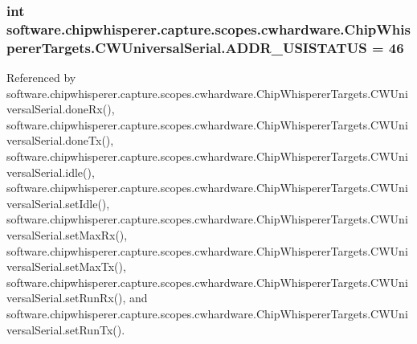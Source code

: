 \subsubsection[{A\+D\+D\+R\+\_\+\+U\+S\+I\+S\+T\+A\+T\+U\+S}]{\setlength{\rightskip}{0pt plus 5cm}int software.\+chipwhisperer.\+capture.\+scopes.\+cwhardware.\+Chip\+Whisperer\+Targets.\+C\+W\+Universal\+Serial.\+A\+D\+D\+R\+\_\+\+U\+S\+I\+S\+T\+A\+T\+U\+S = 46\hspace{0.3cm}{\ttfamily [static]}}\label{classsoftware_1_1chipwhisperer_1_1capture_1_1scopes_1_1cwhardware_1_1ChipWhispererTargets_1_1CWUniversalSerial_a6365eef9c1c87b5cf93d078ed43a1872}


Referenced by software.\+chipwhisperer.\+capture.\+scopes.\+cwhardware.\+Chip\+Whisperer\+Targets.\+C\+W\+Universal\+Serial.\+done\+Rx(), software.\+chipwhisperer.\+capture.\+scopes.\+cwhardware.\+Chip\+Whisperer\+Targets.\+C\+W\+Universal\+Serial.\+done\+Tx(), software.\+chipwhisperer.\+capture.\+scopes.\+cwhardware.\+Chip\+Whisperer\+Targets.\+C\+W\+Universal\+Serial.\+idle(), software.\+chipwhisperer.\+capture.\+scopes.\+cwhardware.\+Chip\+Whisperer\+Targets.\+C\+W\+Universal\+Serial.\+set\+Idle(), software.\+chipwhisperer.\+capture.\+scopes.\+cwhardware.\+Chip\+Whisperer\+Targets.\+C\+W\+Universal\+Serial.\+set\+Max\+Rx(), software.\+chipwhisperer.\+capture.\+scopes.\+cwhardware.\+Chip\+Whisperer\+Targets.\+C\+W\+Universal\+Serial.\+set\+Max\+Tx(), software.\+chipwhisperer.\+capture.\+scopes.\+cwhardware.\+Chip\+Whisperer\+Targets.\+C\+W\+Universal\+Serial.\+set\+Run\+Rx(), and software.\+chipwhisperer.\+capture.\+scopes.\+cwhardware.\+Chip\+Whisperer\+Targets.\+C\+W\+Universal\+Serial.\+set\+Run\+Tx().

\hypertarget{classsoftware_1_1chipwhisperer_1_1capture_1_1scopes_1_1cwhardware_1_1ChipWhispererTargets_1_1CWUniversalSerial_aa066accbdf5851687af2628fce39f00c}{}
